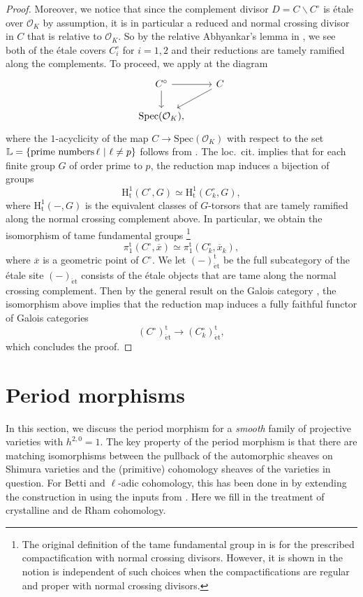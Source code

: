 \documentclass[11pt, letterpaper]{amsart}
\theoremstyle{plain}
\theoremstyle{definition}
\newcommand{\Spec}{\mathrm{Spec}}
\newcommand{\<}{\langle}
\renewcommand{\>}{\rangle}
\newcommand{\sO}{\mathcal{O}}
\newcommand{\et}{\mathrm{{\acute{e}}t}}
\begin{document}
\begin{proof}
    Moreover, we notice that since the complement divisor $D=C\smallsetminus C^\circ$ is \'etale over $\sO_K$ by assumption, it is in particular a reduced and normal crossing divisor in $C$ that is relative to $\sO_K$.
    So by the relative Abhyankar's lemma in , we see both of the \'etale covers $C_i^\circ$ for $i=1,2$ and their reductions are tamely ramified along the complements.
    To proceed, we apply \cite[Expos\'e XIII, Cor.\ 2.8]{SGA1} at the diagram
    \[
    \begin{tikzcd}
    	C^\circ \ar[r] \ar[d] & C \arrow[dl] \\
    	\Spec(\sO_K),&
    \end{tikzcd}
    \]
    where the $1$-acyclicity of the map $C\to \Spec(\sO_K)$ with respect to the set $\mathbb{L}=\{\text{prime numbers\,} \ell~|~\ell\neq p\}$ follows from \cite[Expos\'e XV, Thm.\ 2.1]{SGA4}.
    The loc.\ cit. implies that for each finite group $G$ of order prime to $p$, the reduction map induces a bijection of groups
    \[
    \mathrm{H}^1_\mathrm{t}(C^\circ, G) \simeq \mathrm{H}^1_\mathrm{t}(C^\circ_k, G),
    \]
    where $\mathrm{H}^1_\mathrm{t}(-,G)$ is the equivalent classes of $G$-torsors that are tamely ramified along the normal crossing complement above.
    In particular, we obtain the isomorphism of tame fundamental groups
    \footnote{The original definition of the tame fundamental group in \cite[Expor\'e XV, 2.1.3]{SGA1} is for the prescribed compactification with normal crossing divisors. 
    	However, it is shown in \cite[Thm.\ 1.1]{KS10} the notion is independent of such choices when the compactifications are regular and proper with normal crossing divisors.}
    \[
    \pi_1^\mathrm{t}(C^\circ, \overline{x}) \simeq \pi_1^\mathrm{t}(C^\circ_k, \overline{x}_k),
    \]
    where $\overline{x}$ is a geometric point of $C^\circ$.
    We let $(-)_{\et}^\mathrm{t}$ be the full subcategory of the \'etale site $(-)_\et$ consists of the \'etale objects that are tame along the normal crossing complement.
    Then by the general result on the Galois category \cite[Expor\'e V, Prop.\ 6.9]{SGA1}, the isomorphism above implies that the reduction map induces a fully faithful functor of Galois categories
    \[
    (C^\circ)_\et^\mathrm{t} \longrightarrow (C^\circ_k)_\et^\mathrm{t}, 
    \]
    which concludes the proof.
\end{proof}




\section{Period morphisms}
\label{sec:period_mor}
In this section, we discuss the period morphism for a \textit{smooth} family of projective varieties with $h^{2, 0} = 1$. 
The key property of the period morphism is that there are matching isomorphisms between the pullback of the automorphic sheaves on Shimura varieties and the (primitive) cohomology sheaves of the varieties in question. 
For Betti and $\ell$-adic cohomology, this has been done in \cite{HYZ} by extending the construction in \cite{MPTate} using the inputs from \cite{Moonen}. 
Here we fill in the treatment of crystalline and de Rham cohomology. 
\end{document}
